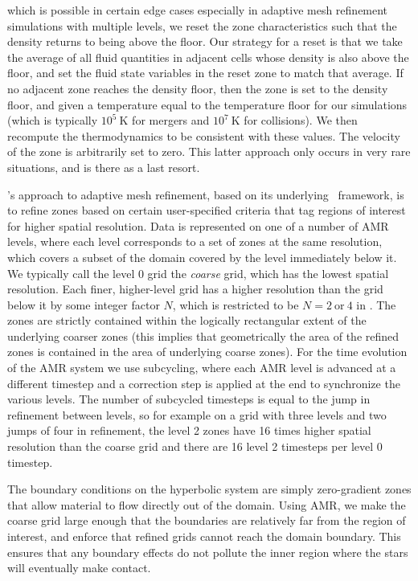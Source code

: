 \documentclass[12pt]{article}
\begin{document}
which is possible in certain edge cases especially in adaptive mesh refinement
simulations with multiple levels, we reset the zone characteristics such that
the density returns to being above the floor. Our strategy for a reset is
that we take the average of all fluid quantities in adjacent cells whose
density is also above the floor, and set the fluid state variables in the
reset zone to match that average. If no adjacent zone reaches the density
floor, then the zone is set to the density floor, and given a temperature
equal to the temperature floor for our simulations (which is typically
$10^{5}\ \text{K}$ for mergers and $10^{7}\ \text{K}$ for collisions).
We then recompute the thermodynamics to be consistent with these values.
The velocity of the zone is arbitrarily set to zero. This latter approach only
occurs in very rare situations, and is there as a last resort.

\castro's approach to adaptive mesh refinement, based on its underlying
\boxlib\ framework, is to refine zones based on certain user-specified
criteria that tag regions of interest for higher spatial
resolution. Data is represented on one of a number of AMR levels,
where each level corresponds to a set of zones at the same resolution,
which covers a subset of the domain covered by the level immediately
below it. We typically call the level 0 grid the \textit{coarse} grid,
which has the lowest spatial resolution. Each finer, higher-level grid
has a higher resolution than the grid below it by some integer factor
$N$, which is restricted to be $N = 2\ \text{or}\ 4$ in \castro. The
zones are strictly contained within the logically rectangular extent of the
underlying coarser zones (this implies that geometrically the area of the
refined zones is contained in the area of underlying coarse zones). For the time
evolution of the AMR system we use subcycling, where each AMR level is
advanced at a different timestep and a correction step is applied at
the end to synchronize the various levels. The number of
subcycled timesteps is equal to the jump in refinement between levels,
so for example on a grid with three levels and two jumps of four in
refinement, the level 2 zones have 16 times higher spatial
resolution than the coarse grid and there are 16 level 2 timesteps
per level 0 timestep.

The boundary conditions on the hyperbolic system are simply
zero-gradient zones that allow material to flow directly out of the
domain. Using AMR, we make the coarse grid large enough that the
boundaries are relatively far from the region of interest, and enforce
that refined grids cannot reach the domain boundary. This
ensures that any boundary effects do not pollute the inner region
where the stars will eventually make contact.
\end{document}
